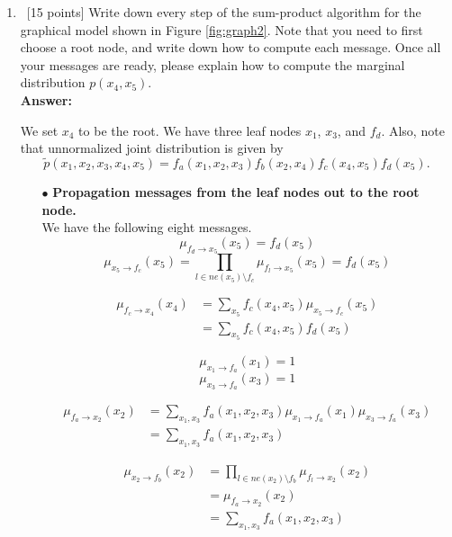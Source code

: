 \documentclass[12pt, fullpage,letterpaper]{article}
\def\red{\color{black!30!red}}
\def\blackblue{\color{black!40!blue}}
\begin{document}
\begin{enumerate}
\item~[15 points] Write down every step of the sum-product algorithm for the graphical model shown in Figure \ref{fig:graph2}. Note that you need to first choose a root node, and write down how to compute each message. Once all your messages are ready, please explain how to compute the marginal distribution $p(x_4, x_5)$.\\
{\bf \red Answer: }{\blackblue 
We set $x_4$ to be the root. We have three leaf nodes $x_1$, $x_3$, and $f_d$. 
Also, note that unnormalized joint distribution is given by $$\tilde{p}(x_1,x_2,x_3,x_4,x_5) = f_a(x_1,x_2,x_3)f_b(x_2,x_4)f_c(x_4,x_5)f_d(x_5).$$
\begin{itemize}
\item[$\bullet$] {\bf Propagation messages from the leaf nodes out to the root node.}\\ 
We have the following eight messages. 
\begin{equation}
\mu_{f_d\rightarrow x_5}(x_5) = f_d(x_5)
\end{equation}
\begin{equation}
\mu_{x_5\rightarrow f_c}(x_5) = \prod_{l\in ne(x_5)\setminus f_c}\mu_{f_l\rightarrow x_5}(x_5) = f_d(x_5)
\end{equation}

\begin{align}
\mu_{f_c\rightarrow x_4}(x_4) & = \sum_{x_5}f_c(x_4,x_5)\mu_{x_5\rightarrow f_c}(x_5)\nonumber \\
& = \sum_{x_5}f_c(x_4,x_5)f_d(x_5)
\end{align}



\begin{equation}
\mu_{x_1\rightarrow f_a}(x_1) = 1
\end{equation}
\begin{equation}
\mu_{x_3\rightarrow f_a}(x_3) = 1
\end{equation}

\begin{align}
\mu_{f_a\rightarrow x_2}(x_2) & =  \sum_{x_1,x_3}f_a(x_1,x_2,x_3)\mu_{x_1\rightarrow f_a}(x_1)\mu_{x_3\rightarrow f_a}(x_3) \nonumber \\
& = \sum_{x_1,x_3}f_a(x_1,x_2,x_3)
\end{align}

\begin{align}
\mu_{x_2\rightarrow f_b}(x_2) 
&=  \prod_{l\in ne(x_2)\setminus f_b}\mu_{f_l\rightarrow x_2}(x_2)\nonumber \\
& = \mu_{f_a\rightarrow x_2}(x_2) \\
& = \sum_{x_1,x_3}f_a(x_1,x_2,x_3)\nonumber 
\end{align}


\end{itemize}}
\end{enumerate}
\end{document}
